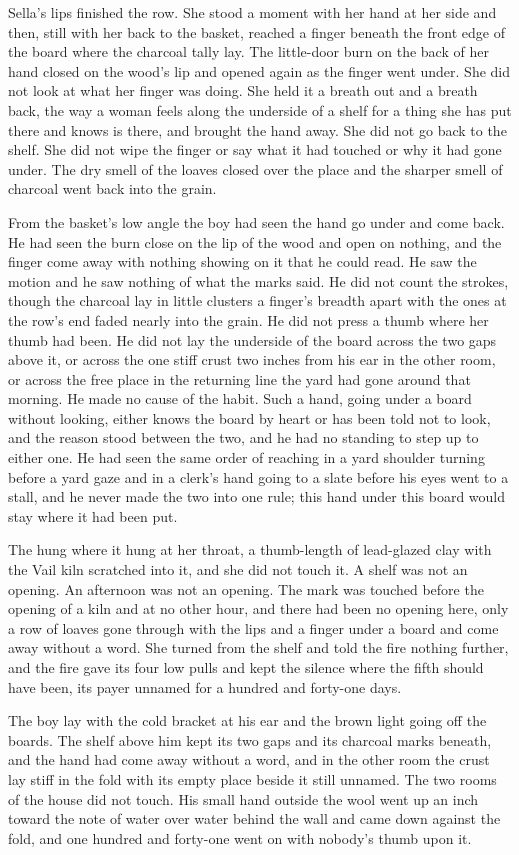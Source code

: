 Sella's lips finished the row. She stood a moment with her hand at her side and then, still with her back to the basket, reached a finger beneath the front edge of the board where the charcoal tally lay. The little-door burn on the back of her hand closed on the wood's lip and opened again as the finger went under. She did not look at what her finger was doing. She held it a breath out and a breath back, the way a woman feels along the underside of a shelf for a thing she has put there and knows is there, and brought the hand away. She did not go back to the shelf. She did not wipe the finger or say what it had touched or why it had gone under. The dry smell of the loaves closed over the place and the sharper smell of charcoal went back into the grain.

From the basket's low angle the boy had seen the hand go under and come back. He had seen the burn close on the lip of the wood and open on nothing, and the finger come away with nothing showing on it that he could read. He saw the motion and he saw nothing of what the marks said. He did not count the strokes, though the charcoal lay in little clusters a finger's breadth apart with the ones at the row's end faded nearly into the grain. He did not press a thumb where her thumb had been. He did not lay the underside of the board across the two gaps above it, or across the one stiff crust two inches from his ear in the other room, or across the free place in the returning line the yard had gone around that morning. He made no cause of the habit. Such a hand, going under a board without looking, either knows the board by heart or has been told not to look, and the reason stood between the two, and he had no standing to step up to either one. He had seen the same order of reaching in a yard shoulder turning before a yard gaze and in a clerk's hand going to a slate before his eyes went to a stall, and he never made the two into one rule; this hand under this board would stay where it had been put.

The  hung where it hung at her throat, a thumb-length of lead-glazed clay with the Vail kiln scratched into it, and she did not touch it. A shelf was not an opening. An afternoon was not an opening. The mark was touched before the opening of a kiln and at no other hour, and there had been no opening here, only a row of loaves gone through with the lips and a finger under a board and come away without a word. She turned from the shelf and told the fire nothing further, and the fire gave its four low pulls and kept the silence where the fifth should have been, its payer unnamed for a hundred and forty-one days.

The boy lay with the cold bracket at his ear and the brown light going off the boards. The shelf above him kept its two gaps and its charcoal marks beneath, and the hand had come away without a word, and in the other room the crust lay stiff in the fold with its empty place beside it still unnamed. The two rooms of the house did not touch. His small hand outside the wool went up an inch toward the note of water over water behind the wall and came down against the fold, and one hundred and forty-one went on with nobody's thumb upon it.
